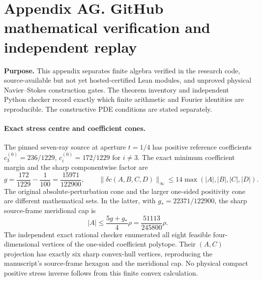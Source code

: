 \clearpage
\section*{Appendix AG. GitHub mathematical verification and independent replay}
\noindent\textbf{Purpose.} This appendix separates finite algebra verified in the research code, source-available but not yet hosted-certified Lean modules, and unproved physical Navier--Stokes construction gates. The theorem inventory and independent Python checker record exactly which finite arithmetic and Fourier identities are reproducible. The constructive PDE conditions are stated separately.

\paragraph{Exact stress centre and coefficient cones.}
The pinned seven-ray source at aperture $t=1/4$ has positive reference coefficients $c_3^{(0)}=236/1229$, $c_i^{(0)}=172/1229$ for $i\ne3$. The exact minimum coefficient margin and the sharp componentwise factor are
\[
g=\frac{172}{1229}-\frac1{100}=\frac{15971}{122900},
\qquad \|\delta c(A,B,C,D)\|_{\infty}\le14\max(|A|,|B|,|C|,|D|).
\]
The original absolute-perturbation cone and the larger one-sided positivity cone are different mathematical sets. In the latter, with $g_*=22371/122900$, the sharp source-frame meridional cap is
\[
 |A|\le\frac{5g+g_*}{4}\rho=\frac{51113}{245800}\rho.
\]
The independent exact rational checker enumerated all eight feasible four-dimensional vertices of the one-sided coefficient polytope. Their $(A,C)$ projection has exactly six sharp convex-hull vertices, reproducing the manuscript's source-frame hexagon and the meridional cap. No physical compact positive stress inverse follows from this finite convex calculation.

